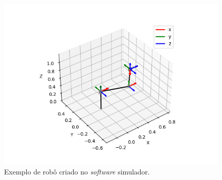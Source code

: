 \begin{figure}[h]
    \caption{Exemplo de robô criado no \textit{software} simulador.}

    \begin{centering}
        \includegraphics[width=0.8\columnwidth]{images/controle/simu-puma.png} 
    \par\end{centering}

    \label{fig:exemplo}
\end{figure}